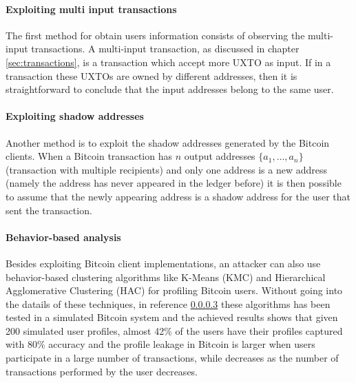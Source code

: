 \paragraph{Exploiting multi input transactions} The first method for obtain
users information consists of observing the multi-input transactions. A
multi-input transaction, as discussed in chapter \ref{sec:transactions}, is a
transaction which accept  more UXTO as input. If in a transaction these UXTOs
are owned by different addresses, then it is straightforward to conclude that
the input addresses belong to the same user.

\paragraph{Exploiting shadow addresses} Another method is to exploit the shadow
addresses generated by the Bitcoin clients. When a Bitcoin transaction has $n$
output addresses $\{a_1 , \dots, a_n \}$ (transaction with multiple recipients)
and only one address is a new address (namely the address has never appeared in
the ledger before) it is then possible to assume that the newly appearing
address is a shadow address for the user that sent the transaction.

\paragraph{Behavior-based analysis} Besides exploiting Bitcoin client
implementations, an attacker can also use behavior-based clustering algorithms
like K-Means (KMC) and Hierarchical Agglomerative Clustering (HAC) for profiling
Bitcoin users. Without going into the datails of these techniques, in reference
\ref{} these algorithms has been tested in a simulated Bitcoin system and the
achieved results shows that given 200 simulated user profiles, almost 42\% of
the users have their profiles captured with 80\% accuracy and the profile
leakage in Bitcoin is larger when users participate in a large number of
transactions, while decreases as the number of transactions performed by the
user decreases.
